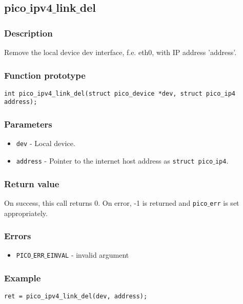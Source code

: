 \subsection{pico$\_$ipv4$\_$link$\_$del}

\subsubsection*{Description}
Remove the local device dev interface, f.e. eth0, with IP address 'address'.

\subsubsection*{Function prototype}
\begin{verbatim}
int pico_ipv4_link_del(struct pico_device *dev, struct pico_ip4 address); 
\end{verbatim}

\subsubsection*{Parameters}
\begin{itemize}[noitemsep]
\item \texttt{dev} - Local device.
\item \texttt{address} - Pointer to the internet host address as \texttt{struct pico$\_$ip4}.
\end{itemize}

\subsubsection*{Return value}
On success, this call returns 0.
On error, -1 is returned and \texttt{pico$\_$err} is set appropriately.

\subsubsection*{Errors}
\begin{itemize}[noitemsep]
\item \texttt{PICO$\_$ERR$\_$EINVAL} - invalid argument
\end{itemize}

\subsubsection*{Example}
\begin{verbatim}
ret = pico_ipv4_link_del(dev, address);
\end{verbatim}



